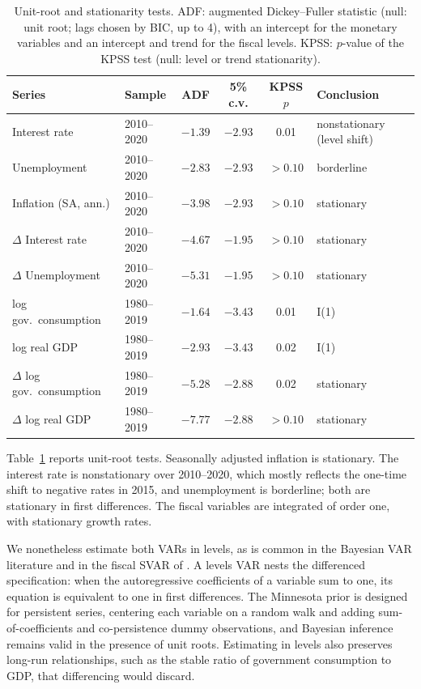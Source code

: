\documentclass[11pt]{article}
\begin{document}
\begin{table}[H]
  \centering
  \caption{Unit-root and stationarity tests. ADF: augmented Dickey--Fuller statistic (null: unit root; lags chosen by BIC, up to 4), with an intercept for the monetary variables and an intercept and trend for the fiscal levels. KPSS: $p$-value of the KPSS test (null: level or trend stationarity).}
  \label{tab:stationarity}
  \begin{tabular}{llcccl}
    \toprule
    Series & Sample & ADF & 5\% c.v. & KPSS $p$ & Conclusion \\
    \midrule
    Interest rate          & 2010--2020 & $-1.39$ & $-2.93$ & 0.01   & nonstationary (level shift) \\
    Unemployment           & 2010--2020 & $-2.83$ & $-2.93$ & $>0.10$ & borderline \\
    Inflation (SA, ann.)   & 2010--2020 & $-3.98$ & $-2.93$ & $>0.10$ & stationary \\
    $\Delta$ Interest rate & 2010--2020 & $-4.67$ & $-1.95$ & $>0.10$ & stationary \\
    $\Delta$ Unemployment  & 2010--2020 & $-5.31$ & $-1.95$ & $>0.10$ & stationary \\
    log gov.\ consumption  & 1980--2019 & $-1.64$ & $-3.43$ & 0.01   & I(1) \\
    log real GDP           & 1980--2019 & $-2.93$ & $-3.43$ & 0.02   & I(1) \\
    $\Delta$ log gov.\ consumption & 1980--2019 & $-5.28$ & $-2.88$ & 0.02 & stationary \\
    $\Delta$ log real GDP  & 1980--2019 & $-7.77$ & $-2.88$ & $>0.10$ & stationary \\
    \bottomrule
  \end{tabular}
\end{table}

Table~\ref{tab:stationarity} reports unit-root tests. Seasonally adjusted inflation is stationary. The interest rate is nonstationary over 2010--2020, which mostly reflects the one-time shift to negative rates in 2015, and unemployment is borderline; both are stationary in first differences. The fiscal variables are integrated of order one, with stationary growth rates.

We nonetheless estimate both VARs in levels, as is common in the Bayesian VAR literature \citep{delnegro2011, glp2015} and in the fiscal SVAR of \citet{blanchardperotti2002}. A levels VAR nests the differenced specification: when the autoregressive coefficients of a variable sum to one, its equation is equivalent to one in first differences. The Minnesota prior is designed for persistent series, centering each variable on a random walk and adding sum-of-coefficients and co-persistence dummy observations, and Bayesian inference remains valid in the presence of unit roots. Estimating in levels also preserves long-run relationships, such as the stable ratio of government consumption to GDP, that differencing would discard.
\end{document}
